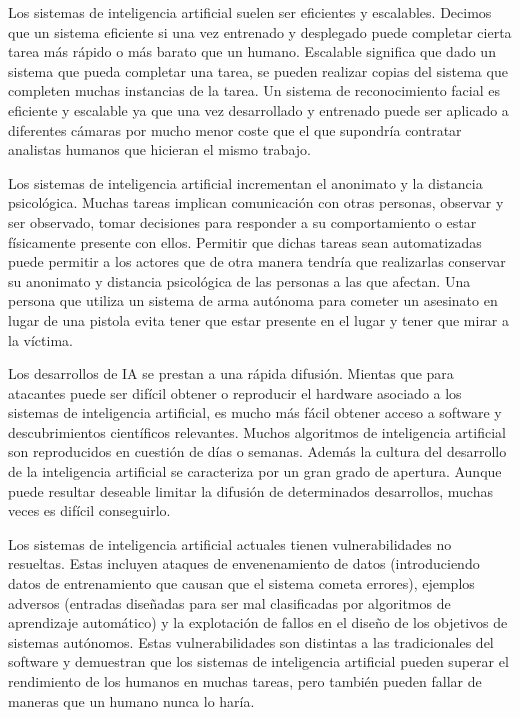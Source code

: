 \documentclass[12pt,a4paper]{article}
\begin{document}
Los sistemas de inteligencia artificial suelen ser eficientes y escalables. Decimos que un sistema eficiente si una vez entrenado y desplegado puede completar cierta tarea más rápido o más barato que un humano. Escalable significa que dado un sistema que pueda completar una tarea, se pueden realizar copias del sistema que completen muchas instancias de la tarea. Un sistema de reconocimiento facial es eficiente y escalable ya que una vez desarrollado y entrenado puede ser aplicado a diferentes cámaras por mucho menor coste que el que supondría contratar analistas humanos que hicieran el mismo trabajo.

Los sistemas de inteligencia artificial incrementan el anonimato y la distancia psicológica. Muchas tareas implican comunicación con otras personas, observar y ser observado, tomar decisiones para responder a su comportamiento o estar físicamente presente con ellos. Permitir que dichas tareas sean automatizadas puede permitir a los actores que de otra manera tendría que realizarlas conservar su anonimato y distancia psicológica de las personas a las que afectan. Una persona que utiliza un sistema de arma autónoma para cometer un asesinato en lugar de una pistola evita tener que estar presente en el lugar y tener que mirar a la víctima.

Los desarrollos de IA se prestan a una rápida difusión. Mientas que para atacantes puede ser difícil obtener o reproducir el hardware asociado a los sistemas de inteligencia artificial, es mucho más fácil obtener acceso a software y descubrimientos científicos relevantes. Muchos algoritmos de inteligencia artificial son reproducidos en cuestión de días o semanas. Además la cultura del desarrollo de la inteligencia artificial se caracteriza por un gran grado de apertura. Aunque puede resultar deseable limitar la difusión de determinados desarrollos, muchas veces es difícil conseguirlo.

Los sistemas de inteligencia artificial actuales tienen vulnerabilidades no resueltas. Estas incluyen ataques de envenenamiento de datos (introduciendo datos de entrenamiento que causan que el sistema cometa errores), ejemplos adversos (entradas diseñadas para ser mal clasificadas por algoritmos de aprendizaje automático) y la explotación de fallos en el diseño de los objetivos de sistemas autónomos. Estas vulnerabilidades son distintas a las tradicionales del software y demuestran que los sistemas de inteligencia artificial pueden superar el rendimiento de los humanos en muchas tareas, pero también pueden fallar de maneras que un humano nunca lo haría.
\end{document}

